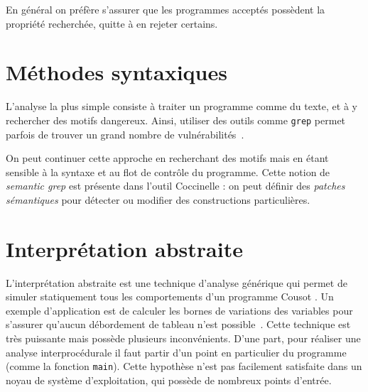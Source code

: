 En général on préfère s'assurer que les programmes acceptés possèdent la
propriété recherchée, quitte à en rejeter certains.

\section{Méthodes syntaxiques}

L'analyse la plus simple consiste à traiter un programme comme du texte, et à y
rechercher des motifs dangereux. Ainsi, utiliser des outils comme \texttt{grep}
permet parfois de trouver un grand nombre de vulnérabilités~\cite{SpenderGrep}.

On peut continuer cette approche en recherchant des motifs mais en étant
sensible à la syntaxe et au flot de contrôle du programme. Cette notion de
\emph{semantic grep} est présente dans l'outil Coccinelle
\cite{coccinelle09,coccinelle11}  : on peut définir des
\emph{patches sémantiques} pour détecter ou modifier des constructions
particulières.

\section{Interprétation abstraite}

L'interprétation abstraite est une technique d'analyse générique qui permet de
simuler statiquement tous les comportements d'un programme Cousot
\cite{Cousot77,Cousot92-1}. Un exemple d'application est de calculer les bornes
de variations des variables pour s'assurer qu'aucun débordement de tableau n'est
possible~\cite{AllamigeonHymansSSTIC07}. Cette technique est très puissante mais
possède plusieurs inconvénients. D'une part, pour réaliser une analyse
interprocédurale il faut partir d'un point en particulier du programme (comme la
fonction \texttt{main}). Cette hypothèse n'est pas facilement satisfaite dans un
noyau de système d'exploitation, qui possède de nombreux points d'entrée.


